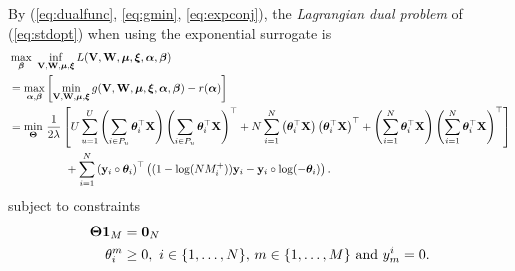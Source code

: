 By (\ref{eq:dualfunc}, \ref{eq:gmin}, \ref{eq:expconj}), the \emph{Lagrangian dual problem} of (\ref{eq:stdopt}) when using the exponential surrogate is
\begin{equation*}
\begin{aligned}
&\max_{{\bm{\beta}}} \ \inf_{\mathbf{V}, \mathbf{W}, \bm{\mu}, \bm{\xi}} L(\mathbf{V}, \mathbf{W}, \bm{\mu}, \bm{\xi}, {\bm{\alpha}}, {\bm{\beta}}) \\
&= \max_{{\bm{\alpha}}, {\bm{\beta}}} \left[ \min_{\mathbf{V}, \mathbf{W}, \bm{\mu}, \bm{\xi}} g(\mathbf{V}, \mathbf{W}, \bm{\mu}, \bm{\xi}, {\bm{\alpha}}, {\bm{\beta}}) - r({\bm{\alpha}}) \right] \\
&= \min_{\mathbf{\Theta}} \, \frac{1}{2 \lambda} \left[
     U \sum_{u=1}^U \left( \sum_{i \in P_u} \bm{\theta}_i^\top \mathbf{X} \right) \left( \sum_{i \in P_u} \bm{\theta}_i^\top \mathbf{X} \right)^\top
   + N \sum_{i=1}^N \left( \bm{\theta}_i^\top \mathbf{X} \right) \left( \bm{\theta}_i^\top \mathbf{X} \right)^\top
   + \left( \sum_{i=1}^N \bm{\theta}_i^\top \mathbf{X} \right) \left( \sum_{i=1}^N \bm{\theta}_i^\top \mathbf{X} \right)^\top \right] \\
& \hspace{5em}
   + \sum_{i=1}^N \left( \mathbf{y}_i \circ \bm{\theta}_i \right)^\top 
     \left( (1 - \log(N M_i^+)) \mathbf{y}_i - \mathbf{y}_i \circ \log(-\bm{\theta}_i) \right).
\end{aligned}
\end{equation*}
subject to constraints
\begin{equation*}
\begin{aligned}
\Thetabm \one_M &= \zero_N \\
\theta_i^m & \ge 0, \ i \in \{1,\dots,N\}, \, m \in \{1,\dots,M\} \ \mathrm{and} \ y_m^i = 0.
\end{aligned}
\end{equation*}

